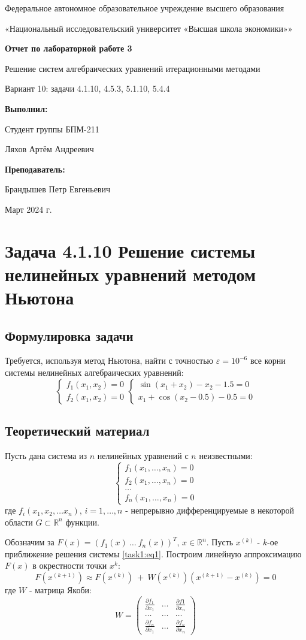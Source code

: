 \documentclass[12pt]{article}%
\date{}{Март 2024 г.}
\newcommand*{\Title}{\begingroup
\centering 

\large {Федеральное автономное образовательное учреждение высшего образования}
\vspace*{\baselineskip}

\large {«Национальный исследовательский университет «Высшая школа экономики»»}
\vspace*{\baselineskip}

\vspace*{\baselineskip}
\large{\textbf{Отчет по лабораторной работе 3}}

\vspace{0.1cm}
\large{Решение систем алгебраических уравнений итерационными методами}

\vspace{0.2cm}
\large{Вариант 10: задачи 4.1.10, 4.5.3, 5.1.10, 5.4.4}

\vspace{1.5cm} 

\begin{flushright}
  \textbf{\normalsize Выполнил:}
  
  \vspace{0.3cm} 
  {\normalsize Студент группы БПМ-211}
  
  {\normalsize Ляхов Артём Андреевич}

\end{flushright}


\vspace{0.2cm}  
\begin{flushright}
  \textbf{\normalsize Преподаватель:} 

  \vspace{0.2cm}

 {\normalsize Брандышев Петр Евгеньевич}
 
\end{flushright}

\vfill
\date{}{Март 2024 г.}


\endgroup\clearpage}
\begin{document}
\Title
\tableofcontents

\newpage

\section{Задача 4.1.10 Решение системы нелинейных уравнений методом Ньютона}
\subsection{Формулировка задачи}
Требуется, используя метод Ньютона, найти с точностью $\varepsilon = 10^{-6}$ все корни системы нелинейных алгебраических уравнений:
\begin{equation}\label{task1:cond}
    \begin{cases}
        f_1(x_1, x_2) = 0 \\
        f_2(x_1, x_2) = 0
    \end{cases}
    \begin{cases}
        \sin(x_1 + x_2) - x_2 - 1.5 = 0 \\
        x_1 + \cos(x_2 - 0.5) - 0.5 = 0
    \end{cases}
\end{equation}

\subsection{Теоретический материал}
Пусть дана система из $n$ нелинейных уравнений с $n$ неизвестными:
\begin{equation}\label{task1:eq1}
    \begin{cases}
        f_1(x_1, \dots, x_n) = 0  \\
        f_2(x_1, \dots, x_n) = 0  \\
        \dots \\
        f_n(x_1, \dots, x_n) = 0
    \end{cases}
\end{equation}
где $f_i(x_1, x_2, \dots x_n)$, $i = 1,\dots, n$ - непрерывно дифференцируемые в некоторой области $G \subset \mathbb{R}^n$ функции.

Обозначим за $F(x) = (f_1(x)\ \dots\ f_n(x))^T$, $x \in \mathbb{R}^n$. Пусть $x^{(k)}$ - $k$-ое приближение решения системы \ref{task1:eq1}. Построим линейную аппроксимацию $F(x)$ в окрестности точки $x^k$:
\begin{equation}\label{task1:eq2}
    F(x^{(k+1)}) \approx F(x^{(k)})\ +\ W(x^{(k)})(x^{(k+1)} - x^{(k)}) = 0
\end{equation}
где $W$ - матрица Якоби:
\begin{equation*}
W = 
\begin{pmatrix}
    \frac{\partial f_1}{\partial x_1} & \dots & 
    \frac{\partial f1}{\partial x_n} \\
    \dots & \dots & \dots \\
    \frac{\partial f_n}{\partial x_1} & \dots &
    \frac{\partial f_n}{\partial x_n}
\end{pmatrix}
\end{equation*}
\end{document}
